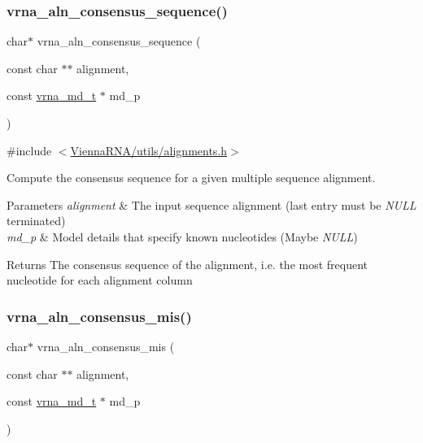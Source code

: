 \subsubsection{\texorpdfstring{vrna\_aln\_consensus\_sequence()}{vrna\_aln\_consensus\_sequence()}}
{\footnotesize\ttfamily char$\ast$ vrna\+\_\+aln\+\_\+consensus\+\_\+sequence (\begin{DoxyParamCaption}\item[{const char $\ast$$\ast$}]{alignment,  }\item[{const \mbox{\hyperlink{group__model__details_ga1f8a10e12a0a1915f2a4eff0b28ea17c}{vrna\+\_\+md\+\_\+t}} $\ast$}]{md\+\_\+p }\end{DoxyParamCaption})}



{\ttfamily \#include $<$\mbox{\hyperlink{utils_2alignments_8h}{Vienna\+R\+N\+A/utils/alignments.\+h}}$>$}



Compute the consensus sequence for a given multiple sequence alignment. 


\begin{DoxyParams}{Parameters}
{\em alignment} & The input sequence alignment (last entry must be {\itshape N\+U\+LL} terminated) \\
\hline
{\em md\+\_\+p} & Model details that specify known nucleotides (Maybe {\itshape N\+U\+LL}) \\
\hline
\end{DoxyParams}
\begin{DoxyReturn}{Returns}
The consensus sequence of the alignment, i.\+e. the most frequent nucleotide for each alignment column 
\end{DoxyReturn}
\mbox{\label{group__aln__utils_gad9e74f6549e819f5f330a06d57d45f2a}} 
\subsubsection{\texorpdfstring{vrna\_aln\_consensus\_mis()}{vrna\_aln\_consensus\_mis()}}
{\footnotesize\ttfamily char$\ast$ vrna\+\_\+aln\+\_\+consensus\+\_\+mis (\begin{DoxyParamCaption}\item[{const char $\ast$$\ast$}]{alignment,  }\item[{const \mbox{\hyperlink{group__model__details_ga1f8a10e12a0a1915f2a4eff0b28ea17c}{vrna\+\_\+md\+\_\+t}} $\ast$}]{md\+\_\+p }\end{DoxyParamCaption})}



